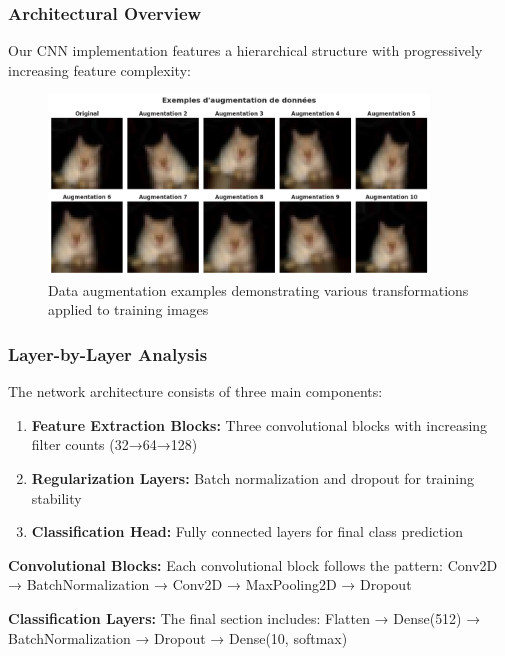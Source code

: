 \documentclass[11pt,a4paper]{article}
\begin{document}
\subsubsection{Architectural Overview}

Our CNN implementation features a hierarchical structure with progressively increasing feature complexity:

\begin{figure}[H]
    \centering
    \includegraphics[width=0.9\textwidth]{tp2_cnn_img/cell_09_output_00_image_03.png}
    \caption{Data augmentation examples demonstrating various transformations applied to training images}
    \label{fig:data_augmentation}
\end{figure}

\subsubsection{Layer-by-Layer Analysis}

The network architecture consists of three main components:

\begin{enumerate}
    \item \textbf{Feature Extraction Blocks:} Three convolutional blocks with increasing filter counts (32→64→128)
    \item \textbf{Regularization Layers:} Batch normalization and dropout for training stability
    \item \textbf{Classification Head:} Fully connected layers for final class prediction
\end{enumerate}

\textbf{Convolutional Blocks:}
Each convolutional block follows the pattern: Conv2D → BatchNormalization → Conv2D → MaxPooling2D → Dropout

\textbf{Classification Layers:}
The final section includes: Flatten → Dense(512) → BatchNormalization → Dropout → Dense(10, softmax)
\end{document}

